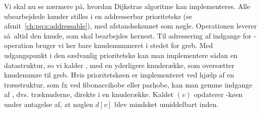 {Vi skal nu se nærmere på, hvordan Dijkstras algoritme kan implementeres.
Alle ubearbejdede knuder stilles i en addresserbar prioritetskø
(se afsnit~\ref{ch:pq:s:addressable}), med afstandsskønnet som nøgle. 
Operationen  leverer så altid den knude, som skal bearbejdes hernest.
Til adressering af indgange for -operation bruger vi her bare knudenummeret i stedet for greb.
Med udgangspunkt i den sædvanlig prioritetskø kan man implementere sådan en datastruktur, so vi kalder , med en yderligere knuderække, som oversætter knudenumre til greb.
Hvis prioritetskøen er implementeret ved hjælp af en træsstruktur, som fx ved fibonaccihobe eller parhobe, kan man gemme indgange af , dvs. træknuderne, direkte i en knuderække.
Kaldet  $(v)$ opdaterer -køen under antagelse af, at nøglen $d[v]$ blev mindsket umiddelbart inden.

}
